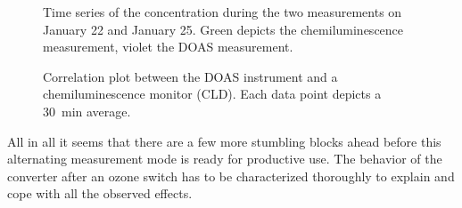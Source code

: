 \begin{figure}[htbp]
  \centering
  
  \hfill
  
  \caption{Time series of the  concentration during the two
    measurements on January 22 and January 25. Green depicts the
    chemiluminescence measurement, violet the DOAS measurement.}
  \label{fig:corr-ts}
\end{figure}
\begin{figure}[htbp]
  \centering
  
  \caption{Correlation plot between the DOAS instrument and a
    chemiluminescence monitor (CLD). Each data point depicts a
    \SI{30}{\minute} average.}
  \label{fig:cld-corr}
\end{figure}

All in all it seems that there are a few more stumbling blocks ahead
before this alternating measurement mode is ready for productive
use. The behavior of the converter after an ozone switch has to be
characterized thoroughly to explain and cope with all the observed
effects.

